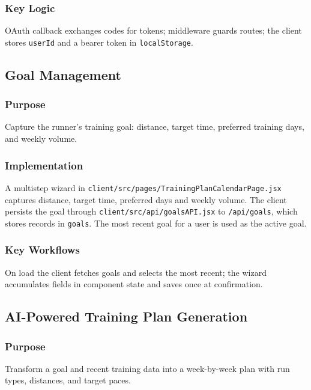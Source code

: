 \subsubsection{Key Logic}
OAuth callback exchanges codes for tokens; middleware guards routes; the client stores \verb|userId| and a bearer token in \verb|localStorage|.

\subsection{Goal Management}
\subsubsection{Purpose}
Capture the runner’s training goal: distance, target time, preferred training days, and weekly volume.

\subsubsection{Implementation}
A multi\-step wizard in \verb|client/src/pages/TrainingPlanCalendarPage.jsx| captures distance, target time, preferred days and weekly volume. The client persists the goal through \verb|client/src/api/goalsAPI.jsx| to \verb|/api/goals|, which stores records in \verb|goals|. The most recent goal for a user is used as the active goal.

\subsubsection{Key Workflows}
On load the client fetches goals and selects the most recent; the wizard accumulates fields in component state and saves once at confirmation.

\subsection{AI-Powered Training Plan Generation}
\subsubsection{Purpose}
Transform a goal and recent training data into a week-by-week plan with run types, distances, and target paces.

